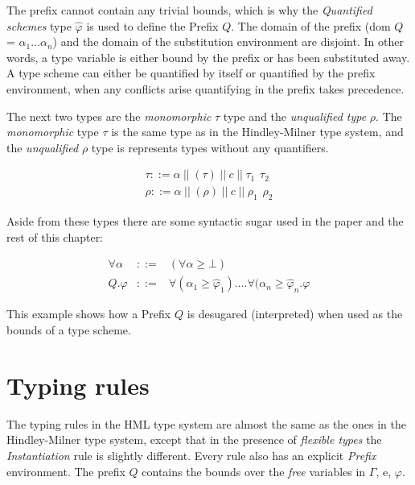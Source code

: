 The prefix cannot contain any trivial bounds, which is why the \emph{Quantified schemes} type $\hat{\varphi}$ is used to define the Prefix $Q$. The domain of the prefix (dom $Q$ = ${\alpha_1 \ldots \alpha_n}$) and the domain of the substitution environment are disjoint. In other words, a type variable is either bound by the prefix or has been substituted away. A type scheme can either be quantified by itself or quantified by the prefix environment, when any conflicts arise quantifying in the prefix takes precedence.

The next two types are the \emph{monomorphic} $\tau$ type and the \emph{unqualified type} $\rho$. The \emph{monomorphic} type $\tau$ is the same type as in the Hindley-Milner type system, and the \emph{unqualified} $\rho$ type is represents types without any quantifiers. 

\begin{eqnarray*}
\tau  ::= \alpha \hspace{3pt} || \hspace{3pt} (\tau) \hspace{3pt} || \hspace{3pt} c \hspace{3pt} || \hspace{3pt} \tau_1 \hspace{5pt} \tau_2 \\
\rho  ::= \alpha \hspace{3pt} || \hspace{3pt} (\rho) \hspace{3pt} || \hspace{3pt} c \hspace{3pt} || \hspace{3pt} \rho_1 \hspace{5pt} \rho_2
\end{eqnarray*}

Aside from these types there are some syntactic sugar used in the paper and the rest of this chapter:
\label{syntax}

\begin{eqnarray*}
\forall \alpha & ::= & (\forall \alpha \geq \bot) \\
Q.\varphi & ::= & \forall(\alpha_1 \geq \hat{\varphi}_1). \ldots \forall(\alpha_n \geq \hat{\varphi}_n . \varphi
\end{eqnarray*}

This example shows how a Prefix $Q$ is desugared (interpreted) when used as the bounds of a type scheme.
 
\section{Typing rules}
The typing rules in the HML type system are almost the same as the ones in the Hindley-Milner type system, except that in the presence of \textit{flexible types} the \emph{Instantiation} rule is slightly different. Every rule also has an explicit \textit{Prefix} environment. The prefix $Q$ contains the bounds over the \emph{free} variables in $\Gamma$, e, $\varphi$.


